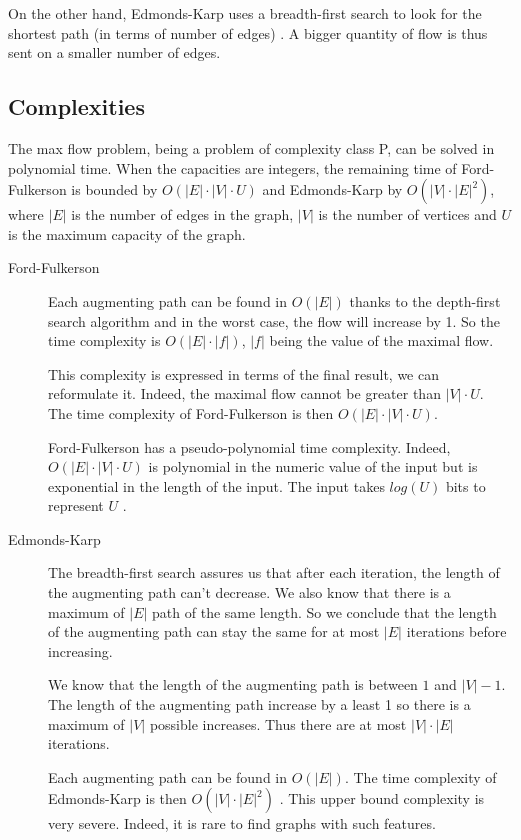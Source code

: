 On the other hand, Edmonds-Karp uses a breadth-first search to look for the shortest path (in terms of number of edges) \cite{lectu7}. A bigger quantity of flow is thus sent on a smaller number of edges. \newline


\subsection{Complexities}
The max flow problem, being a problem of complexity class P, can be solved in polynomial time. When the capacities are integers, the remaining time of Ford-Fulkerson is bounded by $O(|E|\cdot |V|\cdot U)$ and Edmonds-Karp by $O(|V|\cdot |E|^2)$, where $|E|$ is the number of edges in the graph, $|V|$ is the number of vertices and $U$ is the maximum capacity of the graph.

\begin{description}
\item[Ford-Fulkerson]{Each augmenting path can be found in $O(|E|)$ thanks to the depth-first search algorithm and in the worst case, the flow will increase by 1. So the time complexity is $O(|E|\cdot |f|)$, $|f|$ being the value of the maximal flow. 

This complexity is expressed in terms of the final result, we can reformulate it. Indeed, the maximal flow cannot be greater than $|V|\cdot U$. The time complexity of Ford-Fulkerson is then $O(|E|\cdot |V|\cdot U)$.

Ford-Fulkerson has a pseudo-polynomial time complexity. Indeed, $O(|E|\cdot |V|\cdot U)$ is polynomial in the numeric value of the input but is exponential in the length of the input. The input takes $log(U)$ bits to represent $U$ \cite{lectu5}.}

\item[Edmonds-Karp]{The breadth-first search assures us that after each iteration, the length of the augmenting path can't decrease. We also know that there is a maximum of $|E|$ path of the same length. So we conclude that the length of the augmenting path can stay the same for at most $|E|$ iterations before increasing. 

We know that the length of the augmenting path is between $1$ and $|V|-1$. The length of the augmenting path increase by a least 1 so there is a maximum of $|V|$ possible increases. Thus there are at most $|V|\cdot |E|$ iterations.

Each augmenting path can be found in $O(|E|)$. The time complexity of Edmonds-Karp is then $O(|V|\cdot |E|^2)$ \cite{lectu7}. This upper bound complexity is very severe. Indeed, it is rare to find graphs with such features.}
\end{description}



